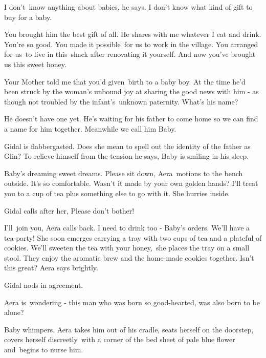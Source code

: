 \documentclass[twoside,11pt]{book}
\begin{document}
 {\textquotedbl}I don't~know anything about babies,{\textquotedbl} he says. {\textquotedbl}I don't know what kind of
gift to buy for a baby.{\textquotedbl}\ 

{\textquotedbl}You brought him the best gift of all. He shares with me whatever I eat and drink. You're so good. You
made it possible{\ }for us to work in the village. You arranged for us~to live
in this~shack after renovating it yourself. And now you've brought us this sweet honey.{\textquotedbl} 

{\textquotedbl}Your Mother told me that you'd given{\ }birth to a baby
boy.{\textquotedbl} At the time he'd been struck by the woman's unbound joy at sharing the good news with him {}- as
though not troubled by the infant's{\ }unknown paternity. {\textquotedbl}What's his
name?{\textquotedbl}\ 

{\textquotedbl}He doesn't have one yet. He's waiting for his father to come home so we can find a name for him together.
Meanwhile we call him Baby.{\textquotedbl} 

Gidal is flabbergasted. Does she mean to spell out the identity of the father as Glin? To relieve himself from the
tension he says, {\textquotedbl}Baby is smiling in his sleep.{\textquotedbl} ~

{\textquotedbl}Baby{}'s dreaming sweet dreams. Please sit down,{\textquotedbl} Aera\ motions to the bench
outside{.} {\textquotedbl}It's so comfortable. Wasn't it made by your own
golden hands? I'll treat you to a cup of tea plus something else to go with it.{\textquotedbl} She hurries inside. 

Gidal calls after her, {\textquotedbl}Please don't bother!{\textquotedbl}

{\textquotedbl}I'll\ join you,{\textquotedbl} Aera calls back. {\textquotedbl}I need to drink too - Baby's orders. We'll
have a tea-party!{\textquotedbl} She soon emerges carrying a tray with two cups of tea and a plateful of cookies.
{\textquotedbl}We'll sweeten the tea with your honey,{\textquotedbl}{\ }she
places the tray on a small stool. They enjoy the aromatic brew and the home-made cookies together. {\textquotedbl}Isn't
this great?{\textquotedbl} Aera says brightly. 

Gidal nods in agreement. 

Aera is\ wondering - this man who was born so good-hearted, was also born to be alone?

Baby whimpers. Aera takes him out of his cradle, seats herself on the doorstep, covers herself
discreetly{\ }with a corner of the bed sheet of pale blue flower and~begins to
nurse him. 
\end{document}
